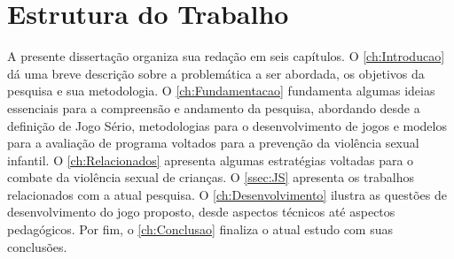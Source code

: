 

\vspace{-0.13cm}


\section{Estrutura do Trabalho}\label{ch:Estrutura}

\vspace{-0.2cm}

A presente dissertação organiza sua redação em seis capítulos. O \autoref{ch:Introducao} dá uma breve descrição sobre a problemática a ser abordada, os objetivos da pesquisa e sua metodologia. O \autoref{ch:Fundamentacao} fundamenta algumas ideias essenciais para a compreensão e andamento da pesquisa, abordando desde a definição de Jogo Sério, metodologias para o desenvolvimento de jogos e modelos para a avaliação de programa voltados para a prevenção da violência sexual infantil. O \autoref{ch:Relacionados} apresenta algumas estratégias voltadas para o combate da violência sexual de crianças. O \autoref{ssec:JS} apresenta os trabalhos relacionados com a atual pesquisa. O \autoref{ch:Desenvolvimento} ilustra as questões de desenvolvimento do jogo proposto, desde aspectos técnicos até aspectos pedagógicos. %
Por fim, o \autoref{ch:Conclusao} finaliza o atual estudo com suas conclusões.


\newpage







